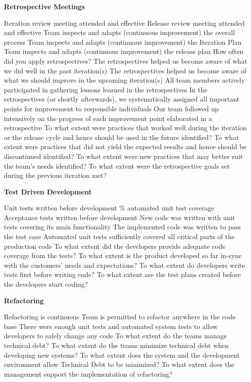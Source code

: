 \textbf{Retrospective Meetings}
\begin{itemize}
	\taa Iteration review meeting attended and effective%
	\taa Release review meeting attended and effective%
	\taa Team inspects and adapts (continuous improvement) the overall process%
	\taa Team inspects and adapts (continuous improvement) the Iteration Plan%
	\taa Team inspects and adapts (continuous improvement) the release plan%
	\pam How often did you apply retrospectives? %
	\pam The retrospectives helped us become aware of what we did well in the past iteration(s)%
	\pam The retrospectives helped us become aware of what we should improve in the upcoming iteration(s)%
	\pam All team members actively participated in gathering lessons learned in the retrospectives%
	\pam In the retrospectives (or shortly afterwards), we systematically assigned all important points for improvement to responsible individuals%
	\pam Our team followed up intensively on the progress of each improvement point elaborated in a retrospective%
	\ops To what extent were practices that worked well during the iteration or the release cycle and hence should be used in the future identified?
	\ops To what extent were practices that did not yield the expected results and hence should be discontinued identified?
	\ops To what extent were new practices that may better suit the team's needs identified?
	\ops To what extent were the retrospective goals set during the previous iteration met? 
\end{itemize}

\textbf{Test Driven Development}
\begin{itemize}
	\taa Unit tests written before development
	\% automated unit test coverage
	\taa Acceptance tests written before development%
	\pam New code was written with unit tests covering its main functionality%
	\pam The implemented code was written to pass the test case%
	\pam Automated unit tests sufficiently covered all critical parts of the production code%
	\ops To what extent did the developers provide adequate code coverage from the tests?
	\ops To what extent is the product developed so far in-sync with the customers' needs and expectations?
	\ops To what extent do developers write tests first before writing code?
	\ops To what extent are the test plans created before the developers start coding? 
\end{itemize}

\textbf{Refactoring}
\begin{itemize}
	\taa Refactoring is continuous
	\taa Team is permitted to refactor anywhere in the code base%
	\pam There were enough unit tests and automated system tests to allow developers to safely change any code%
	\ops To what extent do the teams manage technical debt? 
	\ops To what extent do the teams minimize technical debt when developing new systems? 
	\ops To what extent does the system and the development environment allow Technical Debt to be minimized? 
	\ops To what extent does the management support the implementation of refactoring? 
\end{itemize}

